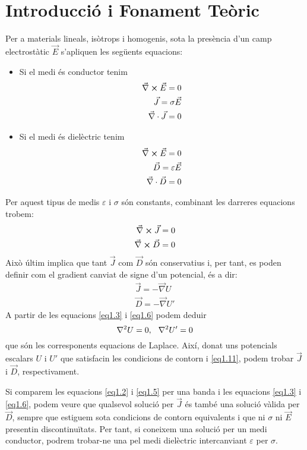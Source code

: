 \documentclass[a4paper,11pt]{report}
\begin{document}
	\section{Introducció i Fonament Teòric}
	Per a materials lineals, isòtrops i homogenis, sota la presència d'un camp electrostàtic $\vec{E}$ s'apliquen les següents equacions:
	\begin{itemize}
		\item Si el medi és conductor tenim
		\begin{align}
			 \vec{\nabla} \cross \vec{E} = 0 \\
			 \vec{J} = \sigma \vec{E} \label{eq1.2}  \\ 
			 \vec{\nabla}\cdot \vec{J} = 0 \label{eq1.3}
		\end{align}
		\item Si el medi és dielèctric tenim
		\begin{align}
			\vec{\nabla} \cross \vec{E} = 0 \\
			\vec{D} = \varepsilon \vec{E} \label{eq1.5} \\ 
			\vec{\nabla}\cdot \vec{D} = 0 \label{eq1.6}
		\end{align}
	\end{itemize}
	Per aquest tipus de medis $\varepsilon$ i $\sigma$ són constants, combinant les darreres equacions trobem:
	\begin{align}
		\vec{\nabla} \cross \vec{J} = 0 \\
		\vec{\nabla} \cross \vec{D} = 0
	\end{align}
	Això últim implica que tant $\vec{J}$ com $\vec{D}$ són conservatius i, per tant, es poden definir com el gradient canviat de signe d'un potencial, és a dir:
	\begin{align}
		\vec{J} = -\vec{\nabla}{U} \\
		\vec{D} = -\vec{\nabla}{U'}
	\end{align}
	A partir de les equacions \eqref{eq1.3} i \eqref{eq1.6} podem deduir
	\begin{equation}
		\nabla^2 U  = 0, \hspace{0.25cm} \nabla^2 U' = 0 \label{eq1.11}
	\end{equation}
	que són les corresponents equacions de Laplace. Així, donat uns potencials escalars $U$ i $U'$ que satisfacin les condicions de contorn i \eqref{eq1.11}, podem trobar $\vec{J}$ i $\vec{D}$, respectivament.
	
	Si comparem les equacions \eqref{eq1.2} i \eqref{eq1.5} per una banda i les equacions \eqref{eq1.3} i \eqref{eq1.6}, podem veure que qualsevol solució per $\vec{J}$ és també una solució vàlida per $\vec{D}$, sempre que estiguem sota condicions de contorn equivalents i que ni $\sigma$ ni $\vec{E}$ presentin discontinuïtats. Per tant, si coneixem una solució per un medi conductor, podrem trobar-ne una pel medi dielèctric intercanviant $\varepsilon$ per $\sigma$.
	
\end{document}
